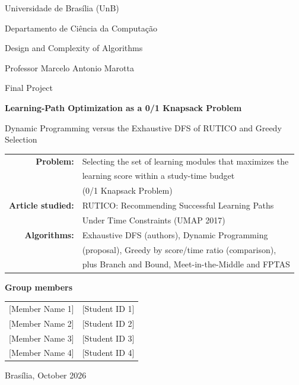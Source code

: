 \documentclass[11pt,a4paper]{article}
\theoremstyle{plain}
\theoremstyle{definition}
\theoremstyle{remark}
\renewcommand{\_}{\textunderscore\hspace{0pt}}  %
\begin{document}
\begin{titlepage}
\centering
{\large Universidade de Bras\'ilia (UnB)\par}
{\large Departamento de Ci\^encia da Computa\c{c}\~ao\par}
\vspace{0.6cm}
{\normalsize Design and Complexity of Algorithms\par}
{\normalsize Professor Marcelo Antonio Marotta\par}
{\normalsize Final Project\par}
\vspace{2.2cm}
{\LARGE\bfseries Learning-Path Optimization as a 0/1 Knapsack Problem\par}
\vspace{0.4cm}
{\Large Dynamic Programming versus the Exhaustive DFS of RUTICO and Greedy Selection\par}
\vspace{1.4cm}
\begin{tabular}{rl}
\textbf{Problem:} & Selecting the set of learning modules that maximizes the\\
& learning score within a study-time budget\\
& (0/1 Knapsack Problem)\\[4pt]
\textbf{Article studied:} & RUTICO: Recommending Successful Learning Paths\\
& Under Time Constraints (UMAP 2017)\\[4pt]
\textbf{Algorithms:} & Exhaustive DFS (authors), Dynamic Programming\\
& (proposal), Greedy by score/time ratio (comparison),\\
& plus Branch and Bound, Meet-in-the-Middle and FPTAS\\
\end{tabular}
\vspace{1.6cm}

{\large\bfseries Group members\par}
\vspace{0.3cm}
\begin{tabular}{ll}
{[Member Name 1]} & {[Student ID 1]}\\
{[Member Name 2]} & {[Student ID 2]}\\
{[Member Name 3]} & {[Student ID 3]}\\
{[Member Name 4]} & {[Student ID 4]}\\
\end{tabular}
\vfill
{\normalsize Bras\'ilia, October 2026\par}
\end{titlepage}
\end{document}
